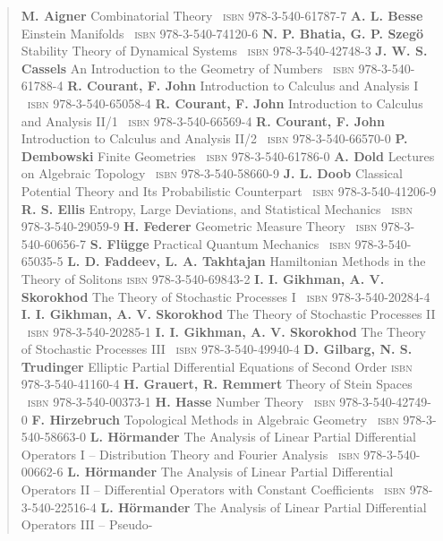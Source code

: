 
\begin{quote}
\textbf{M. Aigner} Combinatorial Theory \ \textsc{isbn} 978-3-540-61787-7
\textbf{A. L. Besse} Einstein Manifolds \ \textsc{isbn} 978-3-540-74120-6
\textbf{N. P. Bhatia, G. P. Szegö} Stability Theory of Dynamical Systems \ \textsc{isbn} 978-3-540-42748-3
\textbf{J. W. S. Cassels} An Introduction to the Geometry of Numbers \ \textsc{isbn} 978-3-540-61788-4
\textbf{R. Courant, F. John} Introduction to Calculus and Analysis I \ \textsc{isbn} 978-3-540-65058-4
\textbf{R. Courant, F. John} Introduction to Calculus and Analysis II/1 \ \textsc{isbn} 978-3-540-66569-4
\textbf{R. Courant, F. John} Introduction to Calculus and Analysis II/2 \ \textsc{isbn} 978-3-540-66570-0
\textbf{P. Dembowski} Finite Geometries \ \textsc{isbn} 978-3-540-61786-0
\textbf{A. Dold} Lectures on Algebraic Topology \ \textsc{isbn} 978-3-540-58660-9
\textbf{J. L. Doob} Classical Potential Theory and Its Probabilistic Counterpart \ \textsc{isbn} 978-3-540-41206-9
\textbf{R. S. Ellis} Entropy, Large Deviations, and Statistical Mechanics \ \textsc{isbn} 978-3-540-29059-9
\textbf{H. Federer} Geometric Measure Theory \ \textsc{isbn} 978-3-540-60656-7
\textbf{S. Flügge} Practical Quantum Mechanics \ \textsc{isbn} 978-3-540-65035-5
\textbf{L. D. Faddeev, L. A. Takhtajan} Hamiltonian Methods in the Theory of Solitons
\hfill \textsc{isbn} 978-3-540-69843-2
\textbf{I. I. Gikhman, A. V. Skorokhod} The Theory of Stochastic Processes I \ \textsc{isbn} 978-3-540-20284-4
\textbf{I. I. Gikhman, A. V. Skorokhod} The Theory of Stochastic Processes II \ \textsc{isbn} 978-3-540-20285-1
\textbf{I. I. Gikhman, A. V. Skorokhod} The Theory of Stochastic Processes III \ \textsc{isbn} 978-3-540-49940-4
\textbf{D. Gilbarg, N. S. Trudinger} Elliptic Partial Differential Equations of Second Order
\hfill \textsc{isbn} 978-3-540-41160-4
\textbf{H. Grauert, R. Remmert} Theory of Stein Spaces \ \textsc{isbn} 978-3-540-00373-1
\textbf{H. Hasse} Number Theory \ \textsc{isbn} 978-3-540-42749-0
\textbf{F. Hirzebruch} Topological Methods in Algebraic Geometry \ \textsc{isbn} 978-3-540-58663-0
\textbf{L. Hörmander} The Analysis of Linear Partial Differential Operators I -- Distribution Theory
and Fourier Analysis \ \textsc{isbn} 978-3-540-00662-6
\textbf{L. Hörmander} The Analysis of Linear Partial Differential Operators II -- Differential
Operators with Constant Coefficients \ \textsc{isbn} 978-3-540-22516-4
\textbf{L. Hörmander} The Analysis of Linear Partial Differential Operators III -- Pseudo-

\end{quote}
